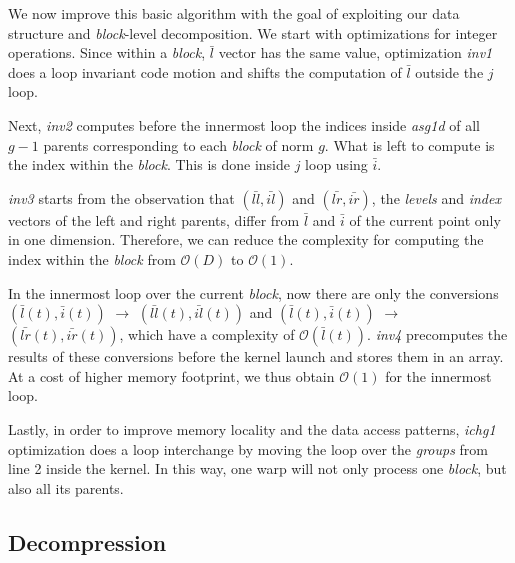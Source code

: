 We now improve this basic algorithm with the goal of exploiting our data
structure and \textit{block}-level decomposition. We start with optimizations
for integer operations. Since within a \textit{block}, $\bar{l}$ vector has the
same value, optimization \textit{inv1} does a loop invariant code motion and
shifts the computation of $\bar{l}$ outside the $j$ loop.

Next, \textit{inv2} computes before the innermost loop the indices inside
\textit{asg1d} of all $g-1$ parents corresponding to each \textit{block} of norm
$g$. What is left to compute is the index within the \textit{block}. This is
done inside $j$ loop using $\bar{i}$.

\textit{inv3} starts from the observation that $(\bar{ll}, \bar{il})$ and
$(\bar{lr}, \bar{ir})$, the \textit{levels} and \textit{index} vectors of the
left and right parents, differ from $\bar{l}$ and $\bar{i}$ of the current point
only in one dimension. Therefore, we can reduce the complexity for computing the
index within the \textit{block} from $\mathcal{O}(D)$ to $\mathcal{O}(1)$.

In the innermost loop over the current \textit{block}, now there are only the
conversions $(\bar{l}(t), \bar{i}(t))$ $\rightarrow$ $(\bar{ll}(t),
\bar{il}(t))$ and $(\bar{l}(t), \bar{i}(t))$ $\rightarrow$ $(\bar{lr}(t),
\bar{ir}(t))$, which have a complexity of $\mathcal{O}(\bar{l}(t))$.
\textit{inv4} precomputes the results of these conversions before the kernel
launch and stores them in an array. At a cost of higher memory footprint, we
thus obtain $\mathcal{O}(1)$ for the innermost loop.

Lastly, in order to improve memory locality and the data access patterns,
\textit{ichg1} optimization does a loop interchange by moving the loop over the
\textit{groups} from line 2 inside the kernel. In this way, one warp will not
only process one \textit{block}, but also all its parents.

\subsection{Decompression}

